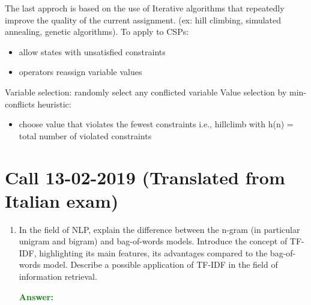 \documentclass[12pt]{article}
\begin{document}
\begin{enumerate}
    The last approch is based on the use of Iterative algorithms that repeatedly improve the quality of the current assignment.
    (ex: hill climbing, simulated annealing, genetic algorithms).
    To apply to CSPs: 
    \begin{itemize}
        \item allow states with unsatisfied constraints
        \item operators reassign variable values
    \end{itemize}
    Variable selection: randomly select any conflicted variable 
    Value selection by min-conflicts heuristic: 
    \begin{itemize}
        \item choose value that violates the fewest constraints i.e., hillclimb with h(n) = total number of violated constraints
    \end{itemize}

\end{enumerate}

\section{Call 13-02-2019 (Translated from Italian exam)}
\begin{enumerate}[label=\textbf{D.\arabic*}]

    \item In the field of NLP, explain the difference between the n-gram (in particular unigram and bigram) and bag-of-words models.
    Introduce the concept of TF-IDF, highlighting its main features, its advantages compared to the bag-of-words model.
    Describe a possible application of TF-IDF in the field of information retrieval.

    \textcolor{green}{\textbf{Answer:}}
\end{enumerate}
\end{document}
